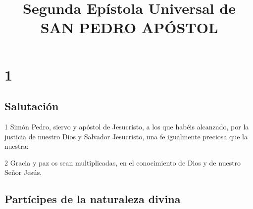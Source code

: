 
\title{Segunda Epístola Universal de SAN PEDRO APÓSTOL}

\chapter{1}

\section*{Salutación}

\par 1 Simón Pedro, siervo y apóstol de Jesucristo, a los que habéis alcanzado, por la justicia de nuestro Dios y Salvador Jesucristo, una fe igualmente preciosa que la nuestra:
\par 2 Gracia y paz os sean multiplicadas, en el conocimiento de Dios y de nuestro Señor Jesús.

\section*{Partícipes de la naturaleza divina}

